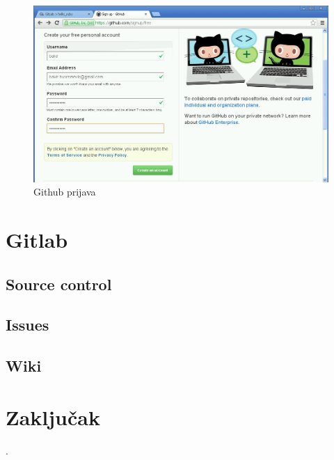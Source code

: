 \documentclass[times, utf8, seminar]{fit}
\begin{document}
\begin{figure}[H]
\centering
\includegraphics[width=15cm]{img/github_prijava.png}
\caption{Github prijava}
\end{figure}




\chapter {Gitlab}
\vspace*{-0.7cm}

\section{Source control}

\section{Issues}

\section{Wiki}

\chapter{Zaključak}

.



\end{document}
